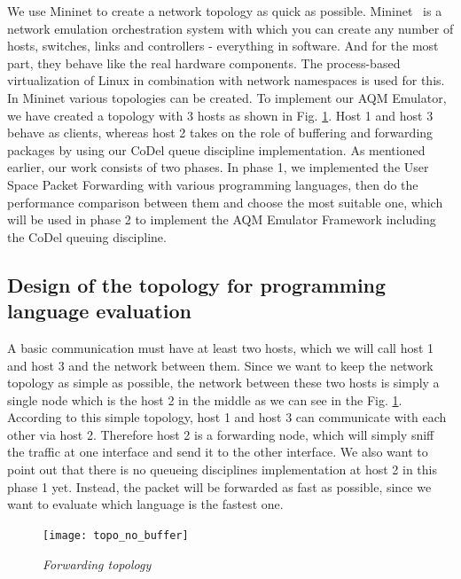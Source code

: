 We use Mininet to create a network topology as quick as possible. Mininet~\cite{6860404} is a network emulation orchestration system with which you can create any number of hosts, switches, links and controllers - everything in software. And for the most part, they behave like the real hardware components. The process-based virtualization of Linux in combination with network namespaces is used for this. \newline
In Mininet various topologies can be created. To implement our AQM Emulator, we have created a topology with 3 hosts as shown in Fig. \ref{fig:topology}. Host 1 and host 3 behave as clients, whereas host 2 takes on the role of buffering and forwarding packages by using our CoDel queue discipline implementation. As mentioned earlier, our work consists of two phases. In phase 1, we implemented the User Space Packet Forwarding with various programming languages, then do the performance comparison between them and choose the most suitable one, which will be used in phase 2 to implement the AQM Emulator Framework including the CoDel queuing discipline.


\subsection{Design of the topology for programming language evaluation}
A basic communication must have at least two hosts, which we will call host 1 and host 3 and the network between them. Since we want to keep the network topology as simple as possible, the network between these two hosts is simply a single node which is the host 2 in the middle as we can see in the Fig. \ref{fig:topology}. According to this simple topology, host 1 and host 3 can communicate with each other via host 2. Therefore host 2 is a forwarding node, which will simply sniff the traffic at one interface and send it to the other interface. We also want to point out that there is no queueing disciplines implementation at host 2 in this phase 1 yet. Instead, the packet will be forwarded as fast as possible, since we want to evaluate which language is the fastest one.

\begin{figure}[htbp]
\centering
\texttt{[image: topo\_no\_buffer]}
\caption{\em Forwarding topology}
\label{fig:topology}
\end{figure}

